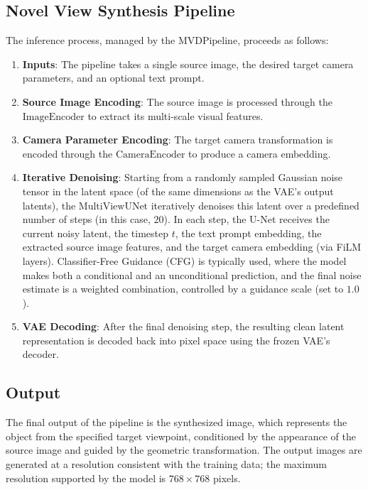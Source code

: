 \subsection{Novel View Synthesis Pipeline}
The inference process, managed by the $\text{MVDPipeline}$, proceeds as follows:
\begin{enumerate}
  \item \textbf{Inputs}: The pipeline takes a single source image, the desired target camera parameters, and an optional text prompt.
  \item \textbf{Source Image Encoding}: The source image is processed through the $\text{ImageEncoder}$ to extract its multi-scale visual features.
  \item \textbf{Camera Parameter Encoding}: The target camera transformation is encoded through the $\text{CameraEncoder}$ to produce a camera embedding.
  \item \textbf{Iterative Denoising}: Starting from a randomly sampled Gaussian noise tensor in the latent space (of the same dimensions as the VAE's output latents), the $\text{MultiViewUNet}$ iteratively denoises this latent over a predefined number of steps (in this case, $20$). In each step, the U-Net receives the current noisy latent, the timestep $t$, the text prompt embedding, the extracted source image features, and the target camera embedding (via FiLM layers). Classifier-Free Guidance (CFG) is typically used, where the model makes both a conditional and an unconditional prediction, and the final noise estimate is a weighted combination, controlled by a guidance scale (set to $1.0$).
  \item \textbf{VAE Decoding}: After the final denoising step, the resulting clean latent representation is decoded back into pixel space using the frozen VAE's decoder.
\end{enumerate}

\subsection{Output}
The final output of the pipeline is the synthesized image, which represents the object from the specified target viewpoint, conditioned by the appearance of the source image and guided by the geometric transformation. The output images are generated at a resolution consistent with the training data; the maximum resolution supported by the model is $768 \times 768$ pixels.
